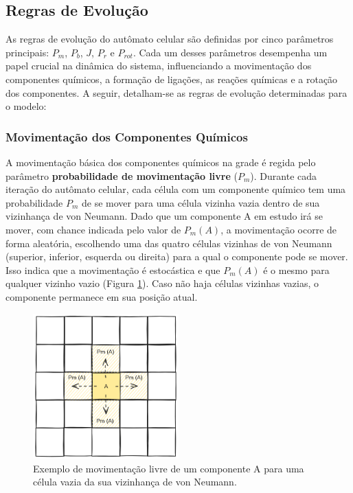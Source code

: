 \documentclass[12pt,oneside]{report}
\begin{document}
\subsection{Regras de Evolução}

As regras de evolução do autômato celular são definidas por cinco parâmetros principais: \hyperref[subsubsec:Pm]{$P_m$}, \hyperref[subsubsec:Pb]{$P_b$}, \hyperref[subsubsec:J]{$J$}, \hyperref[subsubsec:Pr]{$P_r$} e \hyperref[subsubsec:Prot]{$P_{rot}$}. Cada um desses parâmetros desempenha um papel crucial na dinâmica do sistema, influenciando a movimentação dos componentes químicos, a formação de ligações, as reações químicas e a rotação dos componentes. A seguir, detalham-se as regras de evolução determinadas para o modelo:

\subsubsection{Movimentação dos Componentes Químicos}
\label{subsubsec:evolucao_movimentacao}

A movimentação básica dos componentes químicos na grade é regida pelo parâmetro \textbf{probabilidade de movimentação livre} (\hyperref[subsubsec:Pm]{$P_m$}). Durante cada iteração do autômato celular, cada célula com um componente químico tem uma probabilidade $P_m$ de se mover para uma célula vizinha vazia dentro de sua vizinhança de von Neumann. Dado que um componente A em estudo irá se mover, com chance indicada pelo valor de $P_m (A)$, a movimentação ocorre de forma aleatória, escolhendo uma das quatro células vizinhas de von Neumann (superior, inferior, esquerda ou direita) para a qual o componente pode se mover. Isso indica que a movimentação é estocástica e que $P_m (A)$ é o mesmo para qualquer vizinho vazio (Figura \ref{fig:evolucao_Pm}). Caso não haja células vizinhas vazias, o componente permanece em sua posição atual.

\begin{figure}[H]
    \centering
    \includegraphics[width=0.5\textwidth]{evolucao_Pm.png}
    \caption{\small Exemplo de movimentação livre de um componente A para uma célula vazia da sua vizinhança de von Neumann.}
    \label{fig:evolucao_Pm}
\end{figure}
\end{document}
